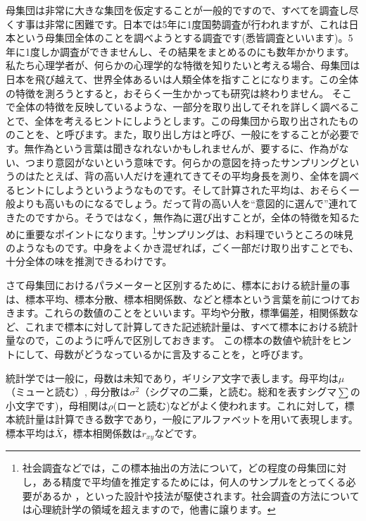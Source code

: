 \documentclass{ltjsbook}
\begin{document}
母集団は非常に大きな集団を仮定することが一般的ですので、すべてを調査し尽くす事は非常に困難です。日本では5年に1度国勢調査が行われますが、これは日本という母集団全体のことを調べようとする調査です(悉皆調査といいます)。5年に1度しか調査ができませんし、その結果をまとめるのにも数年かかります。私たち心理学者が、何らかの心理学的な特徴を知りたいと考える場合、母集団は日本を飛び越えて、世界全体あるいは人類全体を指すことになります。この全体の特徴を測ろうとすると，おそらく一生かかっても研究は終わりません。
そこで全体の特徴を反映しているような、一部分を取り出してそれを詳しく調べることで、全体を考えるヒントにしようとします。この母集団から取り出されたもののことを、と呼びます。また，取り出し方はと呼び、一般にをすることが必要です。無作為という言葉は聞きなれないかもしれませんが、要するに、作為がない、つまり意図がないという意味です。何らかの意図を持ったサンプリングというのはたとえば、背の高い人だけを連れてきてその平均身長を測り、全体を調べるヒントにしようというようなものです。そして計算された平均は、おそらく一般よりも高いものになるでしょう。だって背の高い人を``意図的に選んで''連れてきたのですから。そうではなく，無作為に選び出すことが，全体の特徴を知るために重要なポイントになります。\footnote{社会調査などでは，この標本抽出の方法について，どの程度の母集団に対し，ある精度で平均値を推定するためには，何人のサンプルをとってくる必要があるか
	，といった設計や技法が駆使されます。社会調査の方法については心理統計学の領域を超えますので，他書に譲ります。}サンプリングは、お料理でいうところの味見のようなものです。中身をよくかき混ぜれば，ごく一部だけ取り出すことでも、十分全体の味を推測できるわけです。

さて母集団におけるパラメーターと区別するために、標本における統計量の事は、標本平均、標本分散、標本相関係数、などと標本という言葉を前につけておきます。これらの数値のことをといいます。平均や分散，標準偏差，相関係数など、これまで標本に対して計算してきた記述統計量は、すべて標本における統計量なので，このように呼んで区別しておきます。
この標本の数値や統計をヒントにして、母数がどうなっているかに言及することを，と呼びます。

統計学では一般に，母数は未知であり，ギリシア文字で表します。母平均は$\mu$（ミューと読む）,
母分散は$\sigma^2$（シグマの二乗，と読む。総和を表すシグマ$\sum$の小文字です)，母相関は$\rho$(ローと読む)などがよく使われます。これに対して，標本統計量は計算できる数字であり，一般にアルファベットを用いて表現します。標本平均は$\bar{X}$，標本相関係数は$r_{xy}$などです。
\end{document}
